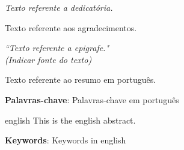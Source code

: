 \documentclass[12pt,a4paper,oneside]{abntex2}
\begin{document}
\begin{dedicatoria}
   \vspace*{\fill}
   \centering
   \noindent
   \textit{Texto referente a dedicatória.} \vspace*{\fill}
\end{dedicatoria}


\begin{agradecimentos}
Texto referente aos agradecimentos.
\end{agradecimentos}


\begin{epigrafe}
    \vspace*{\fill}
	\begin{flushright}
		\textit{``Texto referente a epigrafe." \\
		(Indicar fonte do texto)}
	\end{flushright}
\end{epigrafe}



\setlength{\absparsep}{18pt} %
\begin{resumo}
Texto referente ao resumo em português.

 \textbf{Palavras-chave}: Palavras-chave em português
\end{resumo}

\begin{resumo}[Abstract]
 \begin{otherlanguage*}{english}
   This is the english abstract.

   \vspace{\onelineskip}
 
   \noindent 
   \textbf{Keywords}: Keywords in english
 \end{otherlanguage*}
\end{resumo}


\listoffigures*
\cleardoublepage


\listoftables*
\cleardoublepage

\end{document}
